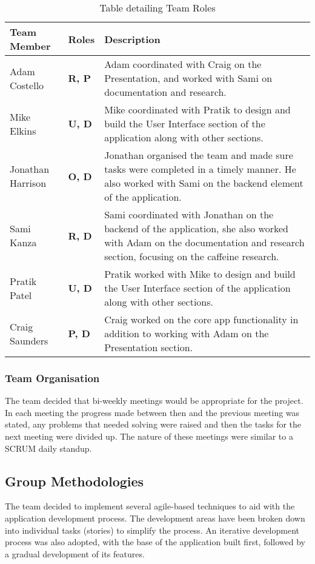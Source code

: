 \begin{table}[ht]
\caption{Table detailing Team Roles}
\label{tab:Roles}
\begin{tabular}{|p{90pt}|p{30pt}|p{304pt}|}
\hline
\textbf{Team Member} 	& \textbf{Roles} 	& \textbf{Description} 
\\\hline
Adam Costello 		& \textbf{R, P} 	& Adam coordinated with Craig on the Presentation, and worked with Sami on documentation and research. 
\\\hline 
Mike Elkins 		& \textbf{U, D} 	& Mike coordinated with Pratik to design and build the User Interface section of the application along with other sections.
\\\hline
Jonathan Harrison 	& \textbf{O, D} 	& Jonathan organised the team and made sure tasks were completed in a timely manner. He also worked with Sami on the backend element of the							  application.
\\\hline
Sami Kanza 		& \textbf{R, D} 	& Sami coordinated with Jonathan on the backend of the application, she also worked with Adam on the documentation and research						  section, focusing on the caffeine research.
\\\hline 
Pratik Patel 		& \textbf{U, D} 	& Pratik worked with Mike to design and build the User Interface section of the application along with other sections. 
\\\hline
Craig Saunders 		& \textbf{P, D} 	& Craig worked on the core app functionality in addition to working with Adam on the Presentation section. 
\\\hline
\end{tabular}
\end{table}

\subsubsection{Team Organisation}
The team decided that bi-weekly meetings would be appropriate for the project. In each meeting the progress made between then and the previous meeting was stated, any problems that needed solving were raised and then the tasks for the next meeting were divided up. The nature of these meetings were similar to a SCRUM \cite{scrum} daily standup.  

\subsection{Group Methodologies}
The team decided to implement several agile-based techniques to aid with the application development process. The development areas have been broken down into individual tasks (stories) to simplify the process. An iterative development process was also adopted, with the base of the application built first, followed by a gradual development of its features. 

